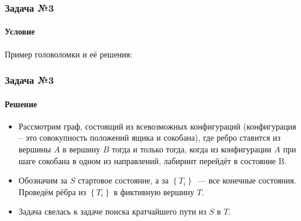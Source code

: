\documentclass{beamer}
\begin{document}
\begin{frame}
\frametitle{Задача №3}
\framesubtitle{Условие}
Пример головоломки и её решения:
\begin{figure}[ht]
\begin{center}
\end{center}
\end{figure}
\end{frame}








\begin{frame}
\frametitle{Задача №3}
\framesubtitle{Решение}
\begin{itemize}
\item Рассмотрим граф, состоящий из всевозможных конфигураций (конфигурация -- это совокупность положений ящика и сокобана), где ребро ставится из вершины $A$ в вершину $B$ тогда и только тогда, когда из конфигурации $A$ при шаге сокобана в одном из направлений, лабиринт перейдёт в состояние B. 
\item Обозначим за $S$ стартовое состояние, а за $\left\{T_i\right\}$~--- все конечные состояния. Проведём рёбра из $\left\{T_i\right\}$ в фиктивную вершину $T$.
\item Задача свелась к задаче поиска кратчайшего пути из $S$ в $T$.
\end{itemize}
\end{frame}
\end{document}
